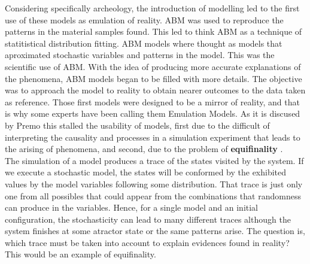 \documentclass[11pt,oneside,a4paper,openright]{report}
\begin{document}
Considering specifically archeology, the introduction of modelling led to the first use of these models as emulation of reality. ABM was used to reproduce the patterns in the material samples found. This led to think ABM as a technique
of statitistical distribution fitting. ABM models where thought as models that aproximated stochastic variables and patterns in the model. This was the scientific use of ABM. With the idea of producing more accurate explanations of the phenomena, ABM models began to be filled with more details. The objective was to approach the model to reality to obtain nearer outcomes to the data taken as reference. Those first models were designed to be a mirror of reality, and that is why some experts have been calling them Emulation Models. As it is discused by Premo \cite[p.33]{Premo2010} this stalled the usability of models, first due to the difficult of interpreting the causality and processes in a simulation experiment that leads to the arising of phenomena, and second, due to the problem of \textbf{equifinality} \cite[p.31]{Premo2010}.\\
The simulation of a model produces a trace of the states visited by the system. If we execute a stochastic model, the states will be conformed by the exhibited values by the model variables following some distribution. That trace is just only one from all possibles that could appear from the combinations that randomness can produce in the variables. Hence, for a single model and an initial configuration, the stochasticity can lead to many different traces although the system finishes at some atractor state or the same patterns arise. The question is, which trace must be taken into account to explain evidences found in reality? This would be an example of equifinality.\\ 
%
\end{document}
